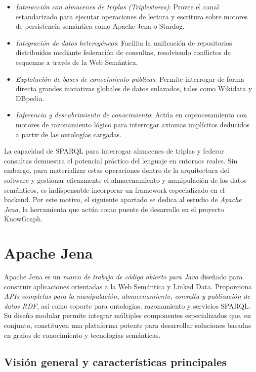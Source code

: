 \documentclass{article}
\begin{document}
\begin{itemize}
    \item \textit{Interacción con almacenes de triplas (Triplestores)}: Provee el canal estandarizado para ejecutar operaciones de lectura y escritura sobre motores de persistencia semántica como Apache Jena o Stardog.
    \item \textit{Integración de datos heterogéneos}: Facilita la unificación de repositorios distribuidos mediante federación de consultas, resolviendo conflictos de esquemas a través de la Web Semántica.
    \item \textit{Explotación de bases de conocimiento públicas}: Permite interrogar de forma directa grandes iniciativas globales de datos enlazados, tales como Wikidata y DBpedia.
    \item \textit{Inferencia y descubrimiento de conocimiento}: Actúa en coprocesamiento con motores de razonamiento lógico para interrogar axiomas implícitos deducidos a partir de las ontologías cargadas.
\end{itemize}

La capacidad de SPARQL para interrogar almacenes de triplas y federar consultas demuestra el potencial práctico del lenguaje en entornos reales. Sin embargo, para materializar estas operaciones dentro de la arquitectura del software y gestionar eficazmente el almacenamiento y manipulación de los datos semánticos, es indispensable incorporar un framework especializado en el backend. Por este motivo, el siguiente apartado se dedica al estudio de \textit{Apache Jena}, la herramienta que actúa como puente de desarrollo en el proyecto KnowGraph.

\section{Apache Jena}

Apache Jena\cite{jena} es un \textit{marco de trabajo de código abierto para Java} diseñado para construir aplicaciones orientadas a la Web Semántica y Linked Data. Proporciona \textit{APIs completas para la manipulación, almacenamiento, consulta y publicación de datos RDF}, así como soporte para ontologías, razonamiento y servicios SPARQL. Su diseño modular permite integrar múltiples componentes especializados que, en conjunto, constituyen una plataforma potente para desarrollar soluciones basadas en grafos de conocimiento y tecnologías semánticas.

\subsection{Visión general y características principales}
\end{document}
